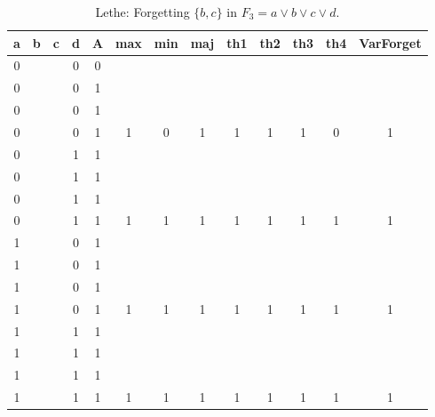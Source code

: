 \begin{table}[!tb]
    \centering
    \begin{tabular}{|c|c|c|c|c|c|c|c|c|c|c|c|c|}
        \hline
        \textbf{a} & \textbf{b} & \textbf{c} & \textbf{d} & \textbf{A} & \textbf{max} & \textbf{min} & \textbf{maj} & \textbf{th1} & \textbf{th2} & \textbf{th3} & \textbf{th4} & \textbf{VarForget} \\ \hline
        \rowcolor{gray!40} 0 &  &  & 0 & 0 &  &  &  &  &  &  &  &  \\ \hline
        \rowcolor{gray!40} 0 &  &  & 0 & 1 &  &  &  &  &  &  &  &  \\ \hline
        \rowcolor{gray!40} 0 &  &  & 0 & 1 &  &  &  &  &  &  &  &  \\ \hline
        \rowcolor{gray!40} 0 &  &  & 0 & 1 & 1 & 0 & 1 & 1 & 1 & 1 & 0 & 1 \\ \hline
        \rowcolor{blue!40} 0 &  &  & 1 & 1 &  &  &  &  &  &  &  &  \\ \hline
        \rowcolor{blue!40} 0 &  &  & 1 & 1 &  &  &  &  &  &  &  &  \\ \hline
        \rowcolor{blue!40} 0 &  &  & 1 & 1 &  &  &  &  &  &  &  &  \\ \hline
        \rowcolor{blue!40} 0 &  &  & 1 & 1 & 1 & 1 & 1 & 1 & 1 & 1 & 1 & 1 \\ \hline
        \rowcolor{red!40} 1 &  &  & 0 & 1 &  &  &  &  &  &  &  &  \\ \hline
        \rowcolor{red!40} 1 &  &  & 0 & 1 &  &  &  &  &  &  &  &  \\ \hline
        \rowcolor{red!40} 1 &  &  & 0 & 1 &  &  &  &  &  &  &  &  \\ \hline
        \rowcolor{red!40} 1 &  &  & 0 & 1 & 1 & 1 & 1 & 1 & 1 & 1 & 1 & 1 \\ \hline
        \rowcolor{green!40} 1 &  &  & 1 & 1 &  &  &  &  &  &  &  &  \\ \hline
        \rowcolor{green!40} 1 &  &  & 1 & 1 &  &  &  &  &  &  &  &  \\ \hline
        \rowcolor{green!40} 1 &  &  & 1 & 1 &  &  &  &  &  &  &  &  \\ \hline
        \rowcolor{green!40} 1 &  &  & 1 & 1 & 1 & 1 & 1 & 1 & 1 & 1 & 1 & 1 \\ \hline
    \end{tabular}
    \caption{Lethe: Forgetting $\{b, c\}$ in $F_{3} = a \lor b \lor c \lor d$.}
    \label{tab:lethe-F3-bc}
\end{table}

